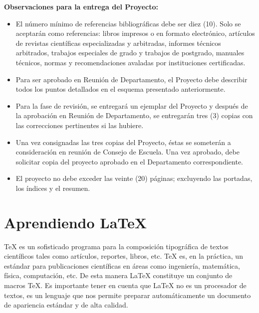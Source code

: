 \noindent\textbf{Observaciones para la entrega del Proyecto:}

\begin{itemize}

\item El n\'{u}mero mínimo de referencias bibliográficas debe ser diez (10). Solo se aceptarán como referencias: libros impresos o en formato electr\'{o}nico, art\'{i}culos de revistas cient\'{i}ficas especializadas y arbitradas, informes t\'{e}cnicos arbitrados, trabajos especiales de grado y trabajos de postgrado, manuales técnicos, normas y recomendaciones avaladas por instituciones certificadas.
\item Para ser aprobado en Reuni\'{o}n de Departamento, el Proyecto debe describir todos los puntos detallados en el esquema presentado anteriormente. 
\item Para la fase de revisi\'{o}n, se entregar\'{a} un ejemplar del Proyecto y después de la aprobaci\'{o}n en Reuni\'{o}n de Departamento, se entregar\'{a}n tres (3) copias con las correcciones pertinentes si las hubiere.
\item Una vez consignadas las tres copias del Proyecto, éstas se someterán a consideración en reunión de Consejo de Escuela. Una vez aprobado, debe solicitar copia del proyecto aprobado en el Departamento correspondiente. 
\item El proyecto no debe exceder las veinte (20) p\'{a}ginas; excluyendo las portadas, los índices y el resumen.

\end{itemize}





\section{Aprendiendo \LaTeX{}}

\TeX{}  es un sofisticado programa para la composición tipográfica de textos cient\'{i}ficos tales como art\'{i}culos, reportes, libros, etc. \TeX{} es, en la práctica, un estándar para publicaciones científicas en áreas como ingeniería, matemática, física, computación, etc. De esta manera \LaTeX{} constituye un conjunto de macros \TeX{}. Es importante tener en cuenta que \LaTeX{} no es un procesador de textos, es un lenguaje que nos permite preparar automáticamente un documento de apariencia estándar y de alta calidad.

